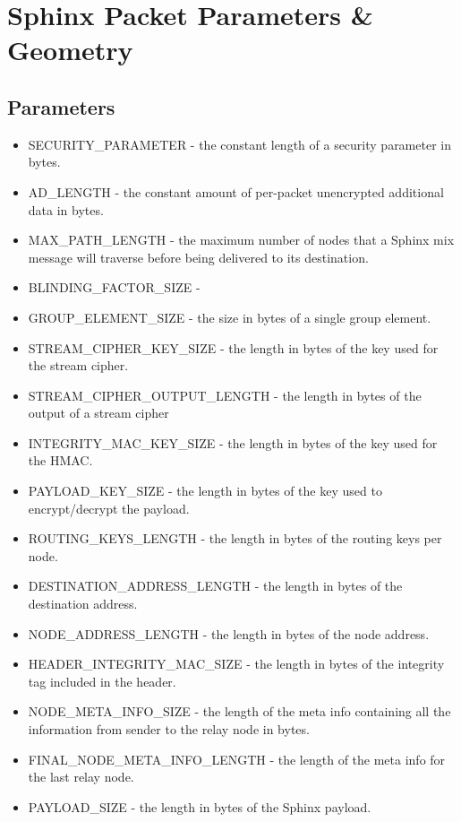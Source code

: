 \section{Sphinx Packet Parameters \& Geometry}\label{sec:paramgeom}

\subsection{Parameters}\label{sec:parameters}
\begin{itemize}
    \item SECURITY\_PARAMETER - the constant length of a security parameter in bytes. 
    \item AD\_LENGTH - the constant amount of per-packet unencrypted additional data in bytes.
    \item MAX\_PATH\_LENGTH - the maximum number of nodes that a Sphinx mix message will traverse before being delivered to its destination.
    \item BLINDING\_FACTOR\_SIZE - 
    \item GROUP\_ELEMENT\_SIZE - the size in bytes of a single group element.
    \item STREAM\_CIPHER\_KEY\_SIZE - the length in bytes of the key used for the stream cipher.
    \item STREAM\_CIPHER\_OUTPUT\_LENGTH - the length in bytes of the output of a stream cipher
    \item INTEGRITY\_MAC\_KEY\_SIZE - the length in bytes of the key used for the HMAC.
    \item PAYLOAD\_KEY\_SIZE - the length in bytes of the key used to encrypt/decrypt the payload.
    \item ROUTING\_KEYS\_LENGTH - the length in bytes of the routing keys per node.
    \item DESTINATION\_ADDRESS\_LENGTH - the length in bytes of the destination address.
    \item NODE\_ADDRESS\_LENGTH - the length in bytes of the node address.
    \item HEADER\_INTEGRITY\_MAC\_SIZE - the length in bytes of the integrity tag included in the header.
    \item NODE\_META\_INFO\_SIZE - the length of the meta info containing all the information from sender to the relay node in bytes.
    \item FINAL\_NODE\_META\_INFO\_LENGTH - the length of the meta info for the last relay node.
    \item PAYLOAD\_SIZE - the length in bytes of the Sphinx payload. 
\end{itemize}

